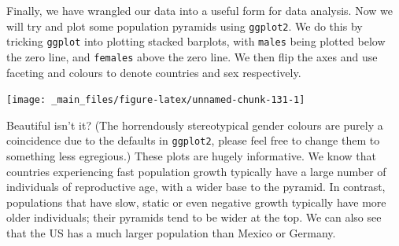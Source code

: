 \documentclass[]{book}
\newenvironment{Shaded}{\begin{snugshade}}{\end{snugshade}}
\newcommand{\KeywordTok}[1]{\textcolor[rgb]{0.13,0.29,0.53}{\textbf{{#1}}}}
\newcommand{\DataTypeTok}[1]{\textcolor[rgb]{0.13,0.29,0.53}{{#1}}}
\newcommand{\DecValTok}[1]{\textcolor[rgb]{0.00,0.00,0.81}{{#1}}}
\newcommand{\StringTok}[1]{\textcolor[rgb]{0.31,0.60,0.02}{{#1}}}
\newcommand{\NormalTok}[1]{{#1}}
\theoremstyle{definition}
\theoremstyle{definition}
\theoremstyle{definition}
\theoremstyle{remark}
\begin{document}
Finally, we have wrangled our data into a useful form for data analysis.
Now we will try and plot some population pyramids using
\texttt{ggplot2}. We do this by tricking \texttt{ggplot} into plotting
stacked barplots, with \texttt{males} being plotted below the zero line,
and \texttt{females} above the zero line. We then flip the axes and use
faceting and colours to denote countries and sex respectively.

\begin{Shaded}
\end{Shaded}

\begin{center}\texttt{[image: \_main\_files/figure-latex/unnamed-chunk-131-1]} \end{center}

Beautiful isn't it? (The horrendously stereotypical gender colours are
purely a coincidence due to the defaults in \texttt{ggplot2}, please
feel free to change them to something less egregious.) These plots are
hugely informative. We know that countries experiencing fast population
growth typically have a large number of individuals of reproductive age,
with a wider base to the pyramid. In contrast, populations that have
slow, static or even negative growth typically have more older
individuals; their pyramids tend to be wider at the top. We can also see
that the US has a much larger population than Mexico or Germany.
\end{document}
